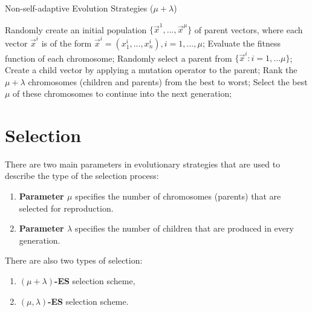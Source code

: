 \begin{algorithm}[H]
\caption{Non-self-adaptive Evolution Strategies ($\mu + \lambda$) \cite{natural-computing-algorithms}}
\label{evolution-strategies}
\begin{algorithmic}[1]
    \State Randomly create an initial population $\{\vec{x}^1,...,\vec{x}^\mu\}$ of parent vectors, where each vector $\vec{x}^i$ is of the form $\vec{x}^i = (x_1^i,...,x_n^i), i = 1,...,\mu$;
    \State Evaluate the fitness function of each chromosome;
    \Repeat
        \Repeat
            \State Randomly select a parent from $\{\vec{x}^i : i = 1,...\mu\}$;
            \State Create a child vector by applying a mutation operator to the parent;
        \State Rank the $\mu + \lambda$ chromosomes (children and parents) from the best to worst;
        \State Select the best $\mu$ of these chromosomes to continue into the next generation;
\end{algorithmic}
\end{algorithm}

\section{Selection}
There are two main parameters in evolutionary strategies that are used to describe the type of the selection process:

 \begin{enumerate}
    \item \textbf{Parameter \boldmath$\mu$} specifies the number of chromosomes (parents) that are selected for reproduction.
    \item \textbf{Parameter \boldmath$\lambda$} specifies the number of children that are produced in every generation.
 \end{enumerate}

There are also two types of selection:
\begin{center}
\begin{minipage}{.4\textwidth}
    \begin{enumerate}
        \item \boldmath$(\mu + \lambda)$\textbf{-ES} selection scheme,
        \item $(\mu,\lambda)$\textbf{-ES} selection scheme.
    \end{enumerate}
\end{minipage}
\end{center}

